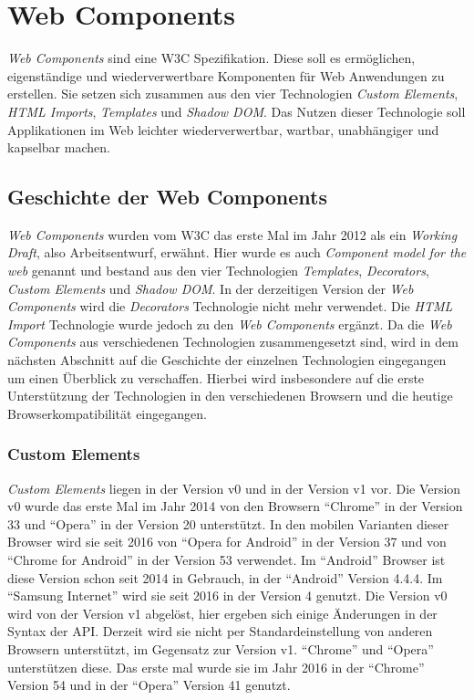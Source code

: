 \documentclass[12pt, paper=a4, bibtotoc, toc=listof, headsepline=true]{scrreprt}
\begin{document}
\chapter{Web Components}
	\emph{Web Components} sind eine \ac{W3C} Spezifikation. Diese soll es ermöglichen, eigenständige und wiederverwertbare Komponenten für Web Anwendungen zu erstellen\cite[S. 1]{patel2015learning}. Sie setzen sich zusammen aus den vier Technologien \emph{Custom Elements}, \emph{\ac{HTML} Imports}, \emph{Templates} und \emph{Shadow \ac{DOM}}. Das Nutzen dieser Technologie soll Applikationen im Web leichter wiederverwertbar, wartbar, unabhängiger und kapselbar machen\cite[S.2]{patel2015learning}.
	\section{Geschichte der Web Components}
	\label{ref:gesVonWebCom}
	\emph{Web Components} wurden vom \ac{W3C} das erste Mal im Jahr 2012 als ein \emph{Working Draft}, also Arbeitsentwurf, erwähnt. Hier wurde es auch \emph{Component model for the web} genannt und bestand aus den vier Technologien \emph{Templates}, \emph{Decorators}, \emph{Custom Elements} und \emph{Shadow DOM}. In der derzeitigen Version der \emph{Web Components} wird die \emph{Decorators} Technologie nicht mehr verwendet. Die \emph{\ac{HTML} Import} Technologie wurde jedoch zu den \emph{Web Components} ergänzt\cite{Cooney2012}. Da die \emph{Web Components} aus verschiedenen Technologien zusammengesetzt sind, wird in dem nächsten Abschnitt auf die Geschichte der einzelnen Technologien eingegangen um einen Überblick zu verschaffen. Hierbei wird insbesondere auf die erste Unterstützung der Technologien in den verschiedenen Browsern und die heutige Browserkompatibilität eingegangen.
		\subsection{Custom Elements}
		\emph{Custom Elements} liegen in der Version v0 und in der Version v1 vor. Die Version v0 wurde das erste Mal im Jahr 2014 von den Browsern \enquote{Chrome} in der Version 33 und \enquote{Opera} in der Version 20 unterstützt. In den mobilen Varianten dieser Browser  wird sie seit 2016 von \enquote{Opera for Android} in der Version 37 und von \enquote{Chrome for Android} in der Version 53 verwendet\cite{C2015}. Im \enquote{Android} Browser ist diese Version schon seit 2014 in Gebrauch, in der \enquote{Android} Version 4.4.4. Im \enquote{Samsung Internet} wird sie seit 2016 in der Version 4 genutzt\cite{cusEleCanIUse}. Die Version v0 wird von der Version v1 abgelöst, hier ergeben sich einige Änderungen in der Syntax der \ac{API}\cite{Bidelman2016cusElev1}. Derzeit wird sie nicht per Standardeinstellung von anderen Browsern unterstützt\cite{firefox}, im Gegensatz zur Version v1. \enquote{Chrome} und \enquote{Opera} unterstützen diese. Das erste mal wurde sie im Jahr 2016 in der \enquote{Chrome} Version 54 und in der \enquote{Opera} Version 41 genutzt\cite{C2016}.
\end{document}
